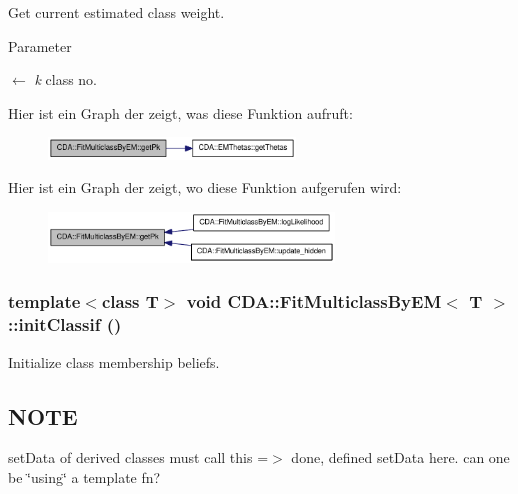 Get current estimated class weight. 


\begin{DoxyParams}{Parameter}
\item[\mbox{$\leftarrow$} {\em k}]class no. \end{DoxyParams}


Hier ist ein Graph der zeigt, was diese Funktion aufruft:\nopagebreak
\begin{figure}[H]
\begin{center}
\leavevmode
\includegraphics[width=186pt]{classCDA_1_1FitMulticlassByEM_a869530b76ee4b40d38d3fb80ea0932aa_cgraph}
\end{center}
\end{figure}




Hier ist ein Graph der zeigt, wo diese Funktion aufgerufen wird:\nopagebreak
\begin{figure}[H]
\begin{center}
\leavevmode
\includegraphics[width=215pt]{classCDA_1_1FitMulticlassByEM_a869530b76ee4b40d38d3fb80ea0932aa_icgraph}
\end{center}
\end{figure}


\hypertarget{classCDA_1_1FitMulticlassByEM_a10d9a6e699530aa071dd33ea7b980f53}{
\subsubsection[{initClassif}]{\setlength{\rightskip}{0pt plus 5cm}template$<$class T$>$ void {\bf CDA::FitMulticlassByEM}$<$ T $>$::initClassif ()}}
\label{classCDA_1_1FitMulticlassByEM_a10d9a6e699530aa071dd33ea7b980f53}


Initialize class membership beliefs. 

\hypertarget{GaussianMixtureModel1D_8h_09_09_NOTE}{}\subsection{NOTE}\label{GaussianMixtureModel1D_8h_09_09_NOTE}
setData of derived classes must call this =$>$ done, defined setData here. can one be \char`\"{}using\char`\"{} a template fn? 

